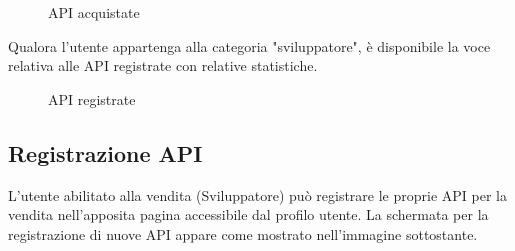 \label{API acquistate}
\begin{figure}[H]
	\centering
	\caption{API acquistate}
\end{figure}

Qualora l'utente appartenga alla categoria "sviluppatore", è disponibile la voce relativa alle API registrate con relative statistiche.

\label{API registrate}
\begin{figure}[H]
	\centering
	\caption{API registrate}
\end{figure}

\subsection{Registrazione API}

L'utente abilitato alla vendita (Sviluppatore) può  registrare le proprie API per la vendita nell'apposita pagina accessibile dal profilo utente. La schermata per la registrazione di nuove API appare come mostrato nell'immagine sottostante.

